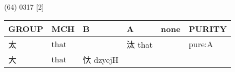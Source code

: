\documentclass[14pt,a4paper]{scrartcl}
\begin{document}
(64) 0317 {[}2{]}

\begin{longtable}[c]{@{}llllll@{}}
\toprule
\begin{minipage}[b]{0.14\columnwidth}\raggedright\strut
GROUP
\strut\end{minipage} &
\begin{minipage}[b]{0.14\columnwidth}\raggedright\strut
MCH
\strut\end{minipage} &
\begin{minipage}[b]{0.14\columnwidth}\raggedright\strut
B
\strut\end{minipage} &
\begin{minipage}[b]{0.14\columnwidth}\raggedright\strut
A
\strut\end{minipage} &
\begin{minipage}[b]{0.14\columnwidth}\raggedright\strut
none
\strut\end{minipage} &
\begin{minipage}[b]{0.14\columnwidth}\raggedright\strut
PURITY
\strut\end{minipage}\tabularnewline
\midrule
\endhead
\begin{minipage}[t]{0.14\columnwidth}\raggedright\strut
太
\strut\end{minipage} &
\begin{minipage}[t]{0.14\columnwidth}\raggedright\strut
that
\strut\end{minipage} &
\begin{minipage}[t]{0.14\columnwidth}\raggedright\strut
\strut\end{minipage} &
\begin{minipage}[t]{0.14\columnwidth}\raggedright\strut
汰 that
\strut\end{minipage} &
\begin{minipage}[t]{0.14\columnwidth}\raggedright\strut
\strut\end{minipage} &
\begin{minipage}[t]{0.14\columnwidth}\raggedright\strut
pure:A
\strut\end{minipage}\tabularnewline
\begin{minipage}[t]{0.14\columnwidth}\raggedright\strut
大
\strut\end{minipage} &
\begin{minipage}[t]{0.14\columnwidth}\raggedright\strut
that
\strut\end{minipage} &
\begin{minipage}[t]{0.14\columnwidth}\raggedright\strut
忕 dzyejH
\strut\end{minipage} &

\end{longtable}
\end{document}
